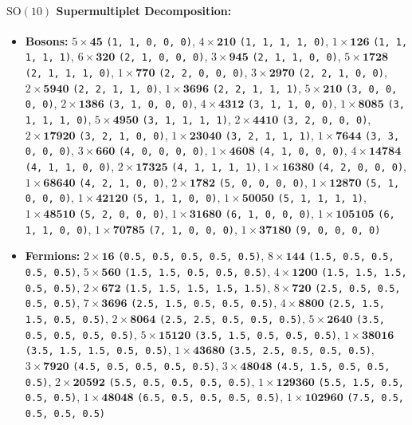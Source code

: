 \documentclass[11pt,a4paper]{article}
\begin{document}
\paragraph{$\mathrm{SO}(10)$ Supermultiplet Decomposition:}
\begin{itemize}
    \item \textbf{Bosons:} $5 \times \mathbf{45}$ \texttt{(1, 1, 0, 0, 0)}, $4 \times \mathbf{210}$ \texttt{(1, 1, 1, 1, 0)}, $1 \times \mathbf{126}$ \texttt{(1, 1, 1, 1, 1)}, $6 \times \mathbf{320}$ \texttt{(2, 1, 0, 0, 0)}, $3 \times \mathbf{945}$ \texttt{(2, 1, 1, 0, 0)}, $5 \times \mathbf{1728}$ \texttt{(2, 1, 1, 1, 0)}, $1 \times \mathbf{770}$ \texttt{(2, 2, 0, 0, 0)}, $3 \times \mathbf{2970}$ \texttt{(2, 2, 1, 0, 0)}, $2 \times \mathbf{5940}$ \texttt{(2, 2, 1, 1, 0)}, $1 \times \mathbf{3696}$ \texttt{(2, 2, 1, 1, 1)}, $5 \times \mathbf{210}$ \texttt{(3, 0, 0, 0, 0)}, $2 \times \mathbf{1386}$ \texttt{(3, 1, 0, 0, 0)}, $4 \times \mathbf{4312}$ \texttt{(3, 1, 1, 0, 0)}, $1 \times \mathbf{8085}$ \texttt{(3, 1, 1, 1, 0)}, $5 \times \mathbf{4950}$ \texttt{(3, 1, 1, 1, 1)}, $2 \times \mathbf{4410}$ \texttt{(3, 2, 0, 0, 0)}, $2 \times \mathbf{17920}$ \texttt{(3, 2, 1, 0, 0)}, $1 \times \mathbf{23040}$ \texttt{(3, 2, 1, 1, 1)}, $1 \times \mathbf{7644}$ \texttt{(3, 3, 0, 0, 0)}, $3 \times \mathbf{660}$ \texttt{(4, 0, 0, 0, 0)}, $1 \times \mathbf{4608}$ \texttt{(4, 1, 0, 0, 0)}, $4 \times \mathbf{14784}$ \texttt{(4, 1, 1, 0, 0)}, $2 \times \mathbf{17325}$ \texttt{(4, 1, 1, 1, 1)}, $1 \times \mathbf{16380}$ \texttt{(4, 2, 0, 0, 0)}, $1 \times \mathbf{68640}$ \texttt{(4, 2, 1, 0, 0)}, $2 \times \mathbf{1782}$ \texttt{(5, 0, 0, 0, 0)}, $1 \times \mathbf{12870}$ \texttt{(5, 1, 0, 0, 0)}, $1 \times \mathbf{42120}$ \texttt{(5, 1, 1, 0, 0)}, $1 \times \mathbf{50050}$ \texttt{(5, 1, 1, 1, 1)}, $1 \times \mathbf{48510}$ \texttt{(5, 2, 0, 0, 0)}, $1 \times \mathbf{31680}$ \texttt{(6, 1, 0, 0, 0)}, $1 \times \mathbf{105105}$ \texttt{(6, 1, 1, 0, 0)}, $1 \times \mathbf{70785}$ \texttt{(7, 1, 0, 0, 0)}, $1 \times \mathbf{37180}$ \texttt{(9, 0, 0, 0, 0)}
    \item \textbf{Fermions:} $2 \times \mathbf{16}$ \texttt{(0.5, 0.5, 0.5, 0.5, 0.5)}, $8 \times \mathbf{144}$ \texttt{(1.5, 0.5, 0.5, 0.5, 0.5)}, $5 \times \mathbf{560}$ \texttt{(1.5, 1.5, 0.5, 0.5, 0.5)}, $4 \times \mathbf{1200}$ \texttt{(1.5, 1.5, 1.5, 0.5, 0.5)}, $2 \times \mathbf{672}$ \texttt{(1.5, 1.5, 1.5, 1.5, 1.5)}, $8 \times \mathbf{720}$ \texttt{(2.5, 0.5, 0.5, 0.5, 0.5)}, $7 \times \mathbf{3696}$ \texttt{(2.5, 1.5, 0.5, 0.5, 0.5)}, $4 \times \mathbf{8800}$ \texttt{(2.5, 1.5, 1.5, 0.5, 0.5)}, $2 \times \mathbf{8064}$ \texttt{(2.5, 2.5, 0.5, 0.5, 0.5)}, $5 \times \mathbf{2640}$ \texttt{(3.5, 0.5, 0.5, 0.5, 0.5)}, $5 \times \mathbf{15120}$ \texttt{(3.5, 1.5, 0.5, 0.5, 0.5)}, $1 \times \mathbf{38016}$ \texttt{(3.5, 1.5, 1.5, 0.5, 0.5)}, $1 \times \mathbf{43680}$ \texttt{(3.5, 2.5, 0.5, 0.5, 0.5)}, $3 \times \mathbf{7920}$ \texttt{(4.5, 0.5, 0.5, 0.5, 0.5)}, $3 \times \mathbf{48048}$ \texttt{(4.5, 1.5, 0.5, 0.5, 0.5)}, $2 \times \mathbf{20592}$ \texttt{(5.5, 0.5, 0.5, 0.5, 0.5)}, $1 \times \mathbf{129360}$ \texttt{(5.5, 1.5, 0.5, 0.5, 0.5)}, $1 \times \mathbf{48048}$ \texttt{(6.5, 0.5, 0.5, 0.5, 0.5)}, $1 \times \mathbf{102960}$ \texttt{(7.5, 0.5, 0.5, 0.5, 0.5)}
\end{itemize}
\end{document}
